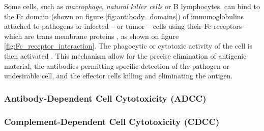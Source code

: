 Some cells, such as \emph{macrophage}, \emph{natural killer cells} or B lymphocytes, 
can bind to the Fc domain (shown on figure \ref{fig:antibody_domains})
of immunoglobulins attached to pathogens or infected -- or tumor -- cells
using their Fc receptors -- which are trans membrane proteins \cite{fridman_fc_1991}, 
as shown on figure \ref{fig:Fc_receptor_interaction}. 
The phagocytic or cytotoxic activity of the cell is then activated \cite{tay_antibody-dependent_2019}.
This mechanism allow for the precise elimination of antigenic material, the antibodies
permitting specific detection of the pathogen or undesirable cell, and the effector cells
killing and eliminating the antigen.

\subsubsection{Antibody-Dependent Cell Cytotoxicity (ADCC)}

\subsubsection{Complement-Dependent Cell Cytotoxicity (CDCC)}
